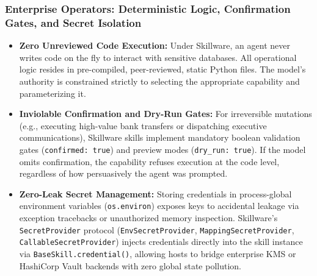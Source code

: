 \subsubsection{Enterprise Operators: Deterministic Logic, Confirmation Gates, and Secret Isolation}
\begin{itemize}[leftmargin=*]
  \item \textbf{Zero Unreviewed Code Execution:} Under Skillware, an agent never writes code on the fly to interact with sensitive databases. All operational logic resides in pre-compiled, peer-reviewed, static Python files. The model's authority is constrained strictly to selecting the appropriate capability and parameterizing it.
  \item \textbf{Inviolable Confirmation and Dry-Run Gates:} For irreversible mutations (e.g., executing high-value bank transfers or dispatching executive communications), Skillware skills implement mandatory boolean validation gates (\texttt{confirmed: true}) and preview modes (\texttt{dry\_run: true}). If the model omits confirmation, the capability refuses execution at the code level, regardless of how persuasively the agent was prompted.
  \item \textbf{Zero-Leak Secret Management:} Storing credentials in process-global environment variables (\texttt{os.environ}) exposes keys to accidental leakage via exception tracebacks or unauthorized memory inspection. Skillware's \texttt{SecretProvider} protocol (\texttt{EnvSecretProvider}, \texttt{MappingSecretProvider}, \texttt{CallableSecretProvider}) injects credentials directly into the skill instance via \texttt{BaseSkill.credential()}, allowing hosts to bridge enterprise KMS or HashiCorp Vault backends with zero global state pollution.
\end{itemize}

